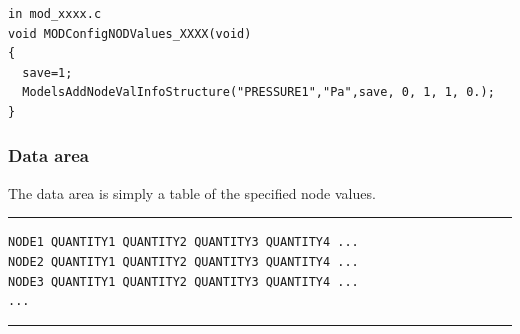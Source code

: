 \footnotesize
\begin{verbatim}
in mod_xxxx.c
void MODConfigNODValues_XXXX(void)
{
  save=1;
  ModelsAddNodeValInfoStructure("PRESSURE1","Pa",save, 0, 1, 1, 0.);
}
\end{verbatim}
\normalsize



\subsubsection{Data area}

The data area is simply a table of the specified node values.

\footnotesize
\hrule
\begin{minipage}[t]{4cm}
\begin{verbatim}
NODE1 QUANTITY1 QUANTITY2 QUANTITY3 QUANTITY4 ...
NODE2 QUANTITY1 QUANTITY2 QUANTITY3 QUANTITY4 ...
NODE3 QUANTITY1 QUANTITY2 QUANTITY3 QUANTITY4 ...
...

\end{verbatim}
\end{minipage}
\hrule
\normalsize

\vfill {}
